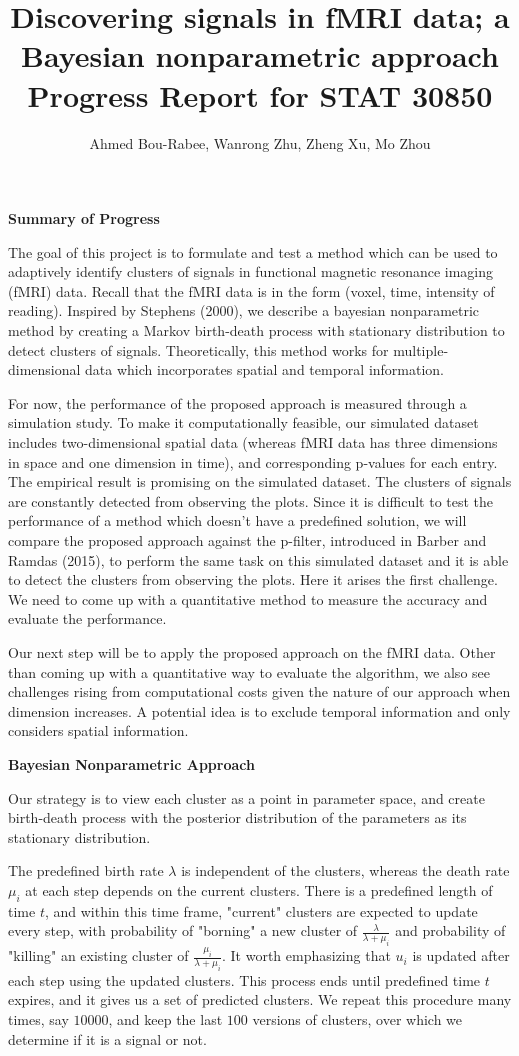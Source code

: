\documentclass[12pt]{article}
\title{Discovering signals in fMRI data; 
a Bayesian nonparametric approach   \\ \large{Progress Report for STAT 30850}}
\author{Ahmed Bou-Rabee, Wanrong Zhu, Zheng Xu, Mo Zhou}
\begin{document}
\maketitle

{\bf Summary of Progress } 

The goal of this project is to formulate and test a method which can be used to adaptively identify  clusters of signals in functional magnetic resonance imaging (fMRI) data. Recall that the fMRI data is in the form (voxel, time, intensity of reading). Inspired by Stephens (2000), we describe a bayesian nonparametric method by creating a Markov birth-death process with stationary distribution to detect clusters of signals. Theoretically, this method works for multiple-dimensional data which incorporates spatial and temporal information.

For now, the performance of the proposed approach is measured through a simulation study. To make it computationally feasible,  our simulated dataset includes two-dimensional spatial data (whereas fMRI data has three dimensions in space and one dimension in time), and corresponding p-values for each entry. The empirical result is promising on the simulated dataset. The clusters of signals are constantly detected from observing the plots. Since it is difficult to test the performance of a method which doesn't have a predefined solution, we will compare the proposed approach against the p-filter, introduced in Barber and Ramdas (2015), to perform the same task on this simulated dataset and it is able to detect the clusters from observing the plots.  Here it arises the first challenge. We need to come up with a quantitative method to measure the accuracy and evaluate the performance. 

Our next step will be to apply the proposed approach on the fMRI data. Other than coming up with a quantitative way to evaluate the algorithm, we also see challenges rising from computational costs given the nature of our approach when dimension increases. A potential idea is to exclude temporal information and only considers spatial information.

\vspace{1em}
{\bf Bayesian Nonparametric Approach}

 Our strategy is to view each cluster as a point in parameter space, and create birth-death process with the posterior distribution of the parameters as its stationary distribution. 
 
 The predefined birth rate $\lambda$ is independent of the clusters, whereas the death rate $\mu_i$ at each step depends on the current clusters. There is a predefined length of time $t$, and within this time frame, "current" clusters are expected to update every step, with probability of "borning" a new cluster of $\frac{\lambda}{\lambda+\mu_i}$ and probability of "killing" an existing cluster of $\frac{\mu_i}{\lambda+\mu_i}$. It worth emphasizing that $u_i$ is updated after each step using the updated clusters. This process ends until predefined time $t$ expires, and it gives us a set of predicted clusters. We repeat this procedure many times, say $10000$, and keep the last $100$ versions of clusters, over which we determine if it is a signal or not.
 
\end{document}
